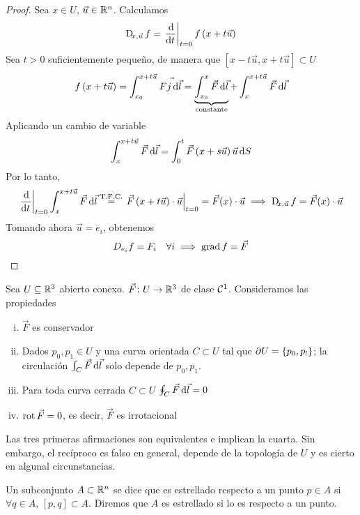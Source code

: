 \begin{proof}
    Sea $x \in U$, $\vec{u} \in \mathbb{R}^n$. Calculamos
    \[
        \Dif_{x, \vec{u}} f = \left. \dv{}{t} \right\vert_{t = 0} f\left( x + t \vec{u} \right)
    \]
    Sea $t > 0$ suficientemente pequeño, de manera que $\left[ x - t \vec{u}, x + t\vec{u}\right] \subset U$
    \begin{gather*}
        f \left( x + t \vec{u} \right) = \int^{x+ t \vec{u}}_{x_0} \vec{Fj \dif \vec{l}} = \underbrace{\int^x_{x_0} \vec{F} \dif \vec{l}}_{\text{constante}}
        + \int^{x + t \vec{u}}_x \vec{F} \dif \vec{l}
    \end{gather*}
    Aplicando un cambio de variable
    \[
        \int^{x + t \vec{u}}_{x} \vec{F} \dif \vec{l} = \int^t_0 \vec{F} \left( x + s \vec{u} \right) \vec{u} \dif S
    \]
    Por lo tanto,
    \[
        \left. \dv{}{t} \right\vert_{t=0} \int^{x + t \vec{u}}_x \vec{F} \dif \vec{l} \stackrel{\text{T.F.C.}}{=}
        \left. \vec{F}\left( x + t \vec{u} \right) \cdot \vec{u} \right\vert_{t=0} = \vec{F}(x) \cdot \vec{u} \implies
        \Dif_{x, \vec{u} }f = \vec{F}(x) \cdot \vec{u}
    \]
    Tomando ahora $\vec{u} = e_i$, obtenemos
    \[
        D_{e_i} f = F_i \quad \forall i \implies \operatorname{grad} f = \vec{F}
    \]
\end{proof}

\begin{teo*}
    Sea $U \subseteq \mathbb{R}^3$ abierto conexo. $\vec{F} \colon U \to \mathbb{R}^3$ de clase $\mathcal{C}^1$. Consideramos las propiedades
    \begin{enumerate}[(i)]
        \item $\vec{F}$ es conservador
        \item Dados $p_0, p_1 \in U$ y una curva orientada $C \subset U$ tal que $\partial U = \left\{p_0, p_!\right\}$; la circulación
            $\int_C \vec{F} \dif \vec{l}$ solo depende de $p_0, p_1$.
        \item Para toda curva cerrada $C \subset U$ $\oint_C \vec{F} \dif \vec{l} = 0$
        \item $\operatorname{rot} \vec{F} = 0$, es decir, $\vec{F}$ es irrotacional
    \end{enumerate}

    Las tres primeras afirmaciones son equivalentes e implican la cuarta. Sin embargo, el recíproco es falso en general,
    depende de la topología de $U$ y es cierto en algunal circunstancias. 
\end{teo*}

\begin{defi}
    Un subconjunto $A \subset \mathbb{R}^n$ se dice que es estrellado respecto a un punto $p \in A$  si $\forall q \in A$,
    $[p, q] \subset A$. Diremos que $A$ es estrellado si lo es respecto a un punto.
\end{defi}

